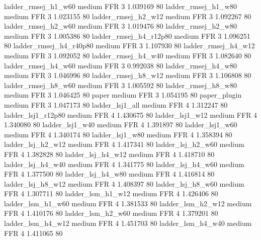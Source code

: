    ladder_rmsej_h1_w60     medium      FFR                 3 1.039169 80
   ladder_rmsej_h1_w80     medium      FFR                 3 1.023155 80
   ladder_rmsej_h2_w12     medium      FFR                 3 1.092267 80
   ladder_rmsej_h2_w60     medium      FFR                 3 1.019476 80
   ladder_rmsej_h2_w80     medium      FFR                 3 1.005386 80
ladder_rmsej_h4_r12p80     medium      FFR                 3 1.096251 80
ladder_rmsej_h4_r40p80     medium      FFR                 3 1.107930 80
   ladder_rmsej_h4_w12     medium      FFR                 3 1.092052 80
   ladder_rmsej_h4_w40     medium      FFR                 3 1.082640 80
   ladder_rmsej_h4_w60     medium      FFR                 3 0.992038 80
   ladder_rmsej_h4_w80     medium      FFR                 3 1.046996 80
   ladder_rmsej_h8_w12     medium      FFR                 3 1.106808 80
   ladder_rmsej_h8_w60     medium      FFR                 3 1.005592 80
   ladder_rmsej_h8_w80     medium      FFR                 3 1.046425 80
                 paper     medium      FFR                 3 1.054195 80
          paper_plugin     medium      FFR                 3 1.047173 80
       ladder_lsj1_all     medium      FFR                 4 1.312247 80
    ladder_lsj1_r12p80     medium      FFR                 4 1.430675 80
       ladder_lsj1_w12     medium      FFR                 4 1.340080 80
       ladder_lsj1_w40     medium      FFR                 4 1.391897 80
       ladder_lsj1_w60     medium      FFR                 4 1.340174 80
       ladder_lsj1_w80     medium      FFR                 4 1.358394 80
     ladder_lsj_h2_w12     medium      FFR                 4 1.417341 80
     ladder_lsj_h2_w60     medium      FFR                 4 1.382828 80
     ladder_lsj_h4_w12     medium      FFR                 4 1.418710 80
     ladder_lsj_h4_w40     medium      FFR                 4 1.341775 80
     ladder_lsj_h4_w60     medium      FFR                 4 1.377500 80
     ladder_lsj_h4_w80     medium      FFR                 4 1.416814 80
     ladder_lsj_h8_w12     medium      FFR                 4 1.408397 80
     ladder_lsj_h8_w60     medium      FFR                 4 1.307711 80
     ladder_lsm_h1_w12     medium      FFR                 4 1.426406 80
     ladder_lsm_h1_w60     medium      FFR                 4 1.381533 80
     ladder_lsm_h2_w12     medium      FFR                 4 1.410176 80
     ladder_lsm_h2_w60     medium      FFR                 4 1.379201 80
     ladder_lsm_h4_w12     medium      FFR                 4 1.451703 80
     ladder_lsm_h4_w40     medium      FFR                 4 1.411065 80
